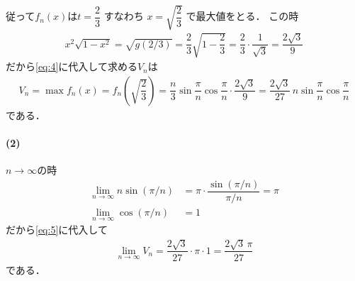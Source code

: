 \documentclass[../../main.tex]{subfiles}
\begin{document}
従って$f_n(x)$は$t=\dfrac{2}{3}$ すなわち $x=\sqrt{\dfrac{2}{3}}$ で最大値をとる．
この時
\begin{align}
  x^2\sqrt{1-x^2}=\sqrt{g(2/3)}=\dfrac{2}{3}\sqrt{1-\dfrac{2}{3}}=\dfrac{2}{3}\cdot\dfrac{1}{\sqrt{3}}=\dfrac{2\sqrt{3}}{9}
\end{align}
だから\cref{eq:4}に代入して求める$V_n$は
\begin{align}
  V_n=\max f_n(x) = f_n\left(\sqrt{\dfrac{2}{3}}\right) = \dfrac{n}{3}\sin\dfrac{\pi}{n}\cos\dfrac{\pi}{n}\cdot\dfrac{2\sqrt{3}}{9}=\dfrac{2\sqrt{3}}{27}\,n\sin\dfrac{\pi}{n}\cos\dfrac{\pi}{n} \label{eq:5}
\end{align}
である．

\paragraph{(2)}
$n\to\infty$の時
\begin{align}
  \lim_{n\to\infty}n\sin(\pi/n)&=\pi\cdot\dfrac{\sin(\pi/n)}{\pi/n}=\pi \\
  \lim_{n\to\infty}\cos(\pi/n) &=1
\end{align}
だから\cref{eq:5}に代入して
\begin{align}
  \lim_{n\to\infty}V_n=\dfrac{2\sqrt{3}}{27}\cdot\pi\cdot1=\dfrac{2\sqrt{3}\,\pi}{27}
\end{align}
である．

\newpage
\end{document}
